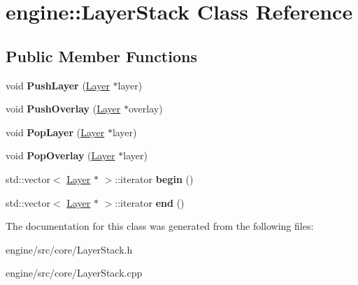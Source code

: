\hypertarget{classengine_1_1LayerStack}{}\section{engine\+:\+:Layer\+Stack Class Reference}
\label{classengine_1_1LayerStack}
\subsection*{Public Member Functions}
\begin{DoxyCompactItemize}
\item
\mbox{\label{classengine_1_1LayerStack_a3e18dd7877bf00498b9771cf91fc9b7c}}
void {\bfseries Push\+Layer} (\hyperlink{classengine_1_1Layer}{Layer} $\ast$layer)
\item
\mbox{\label{classengine_1_1LayerStack_a4b84a2581e5647cd73b5924c7982680f}}
void {\bfseries Push\+Overlay} (\hyperlink{classengine_1_1Layer}{Layer} $\ast$overlay)
\item
\mbox{\label{classengine_1_1LayerStack_a864050f5ad6ed9ffe04974c9411fad94}}
void {\bfseries Pop\+Layer} (\hyperlink{classengine_1_1Layer}{Layer} $\ast$layer)
\item
\mbox{\label{classengine_1_1LayerStack_aecbddf93a6f5846a902570a980a63ddb}}
void {\bfseries Pop\+Overlay} (\hyperlink{classengine_1_1Layer}{Layer} $\ast$layer)
\item
\mbox{\label{classengine_1_1LayerStack_a341bf522aa1af78ba06e3fdf510df271}}
std\+::vector$<$ \hyperlink{classengine_1_1Layer}{Layer} $\ast$ $>$\+::iterator {\bfseries begin} ()
\item
\mbox{\label{classengine_1_1LayerStack_ad05cf0f1deec9dd7f7d8ead15febf657}}
std\+::vector$<$ \hyperlink{classengine_1_1Layer}{Layer} $\ast$ $>$\+::iterator {\bfseries end} ()
\end{DoxyCompactItemize}


The documentation for this class was generated from the following files\+:\begin{DoxyCompactItemize}
\item
engine/src/core/Layer\+Stack.\+h\item
engine/src/core/Layer\+Stack.\+cpp\end{DoxyCompactItemize}
